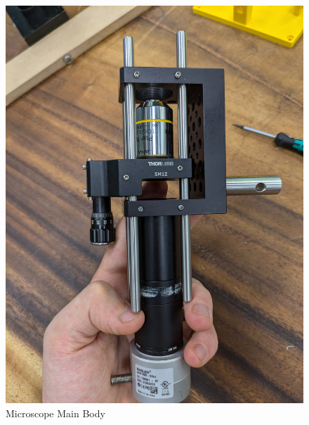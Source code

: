 \documentclass[runningheads]{llncs}
\begin{document}
\begin{figure}[h]
    \begin{minipage}[b]{0.4\textwidth}
        \centering
        \includegraphics[width=\textwidth]{images/main_body.jpg} 
        \caption{Microscope Main Body }
        \label{fig:MainBody}
    \end{minipage}
    \hfill
    \begin{minipage}[b]{0.45\textwidth}
        \centering

\end{minipage}
\end{figure}
\end{document}

